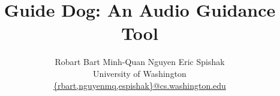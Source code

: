 \documentclass{acm_proc_article-sp}
\begin{document}

\newcommand{\includeimage}[3]{
\begin{center}
\resizebox{!}{#2}{\texttt{[image: images/\#1]}}
\vspace{-1.5\baselineskip}
\end{center}}

\title{Guide Dog: An Audio Guidance Tool}

%
%
%
%
%

%
%
%

\author{
Robart Bart
\qquad
Minh-Quan Nguyen
\qquad
Eric Spishak\\
%
{\normalsize
University of Washington}\\
\url{{rbart,nguyenmq,espishak}@cs.washington.edu}
}
\end{document}

